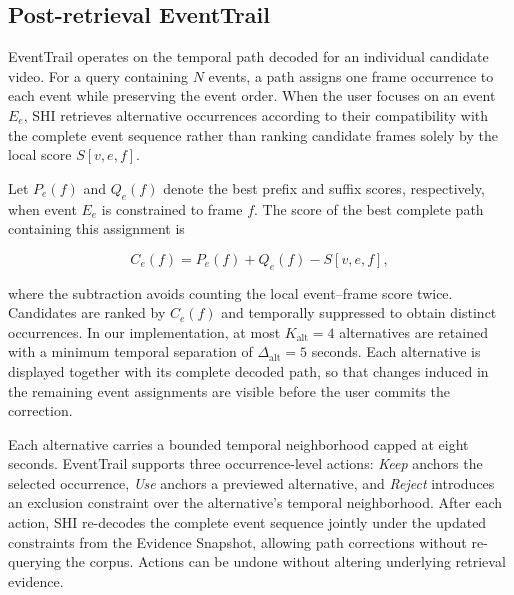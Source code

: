 \subsection{Post-retrieval EventTrail}
\label{sec:event-trail}

EventTrail operates on the temporal path decoded for an individual candidate
video. For a query containing $N$ events, a path assigns one frame occurrence
to each event while preserving the event order. When the user focuses on an
event $E_e$, SHI retrieves alternative occurrences according to their
compatibility with the complete event sequence rather than ranking candidate
frames solely by the local score $S[v,e,f]$.

Let $P_e(f)$ and $Q_e(f)$ denote the best prefix and suffix scores,
respectively, when event $E_e$ is constrained to frame $f$. The score of the
best complete path containing this assignment is

\begin{equation}
C_e(f) = P_e(f) + Q_e(f) - S[v,e,f],
\label{eq:conditioned-path-score}
\end{equation}

where the subtraction avoids counting the local event--frame score twice.
Candidates are ranked by $C_e(f)$ and temporally suppressed to obtain distinct
occurrences. In our implementation, at most $K_{\mathrm{alt}}=4$
alternatives are retained with a minimum temporal separation of
$\Delta_{\mathrm{alt}}=5$ seconds. Each alternative is displayed together
with its complete decoded path, so that changes induced in the remaining
event assignments are visible before the user commits the correction.

Each alternative carries a bounded temporal neighborhood capped at eight seconds.
EventTrail supports three occurrence-level actions: \emph{Keep} anchors the selected
occurrence, \emph{Use} anchors a previewed alternative, and \emph{Reject} introduces
an exclusion constraint over the alternative's temporal neighborhood. After each
action, SHI re-decodes the complete event sequence jointly under the updated
constraints from the Evidence Snapshot, allowing path corrections without re-querying
the corpus. Actions can be undone without altering underlying retrieval evidence.